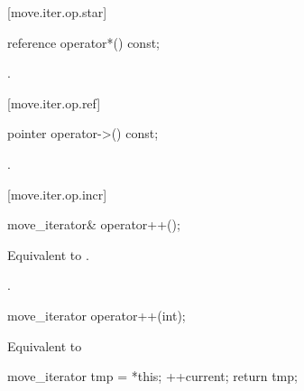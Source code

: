 [move.iter.op.star]{}

%
%
\begin{itemdecl}
reference operator*() const;
\end{itemdecl}

\begin{itemdescr}
\pnum
\removed{\returns}
.
\end{itemdescr}

\begin{removedblock}
[move.iter.op.ref]{}

%
%
\begin{itemdecl}
pointer operator->() const;
\end{itemdecl}

\begin{itemdescr}
\pnum
\returns {}.
\end{itemdescr}
\end{removedblock}

[move.iter.op.incr]{}

%
%
\begin{itemdecl}
move_iterator& operator++();
\end{itemdecl}

\begin{itemdescr}
\pnum
\effects Equivalent to .

\pnum
\returns {}.
\end{itemdescr}

%
%
\begin{itemdecl}
move_iterator operator++(int);
\end{itemdecl}

\begin{itemdescr}
\pnum
\effects Equivalent to
\begin{codeblock}
move_iterator tmp = *this;
++current;
return tmp;
\end{codeblock}
\end{itemdescr}

